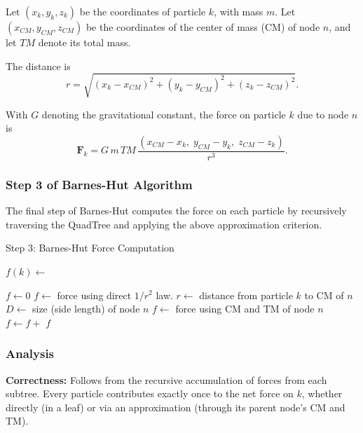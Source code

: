 \documentclass[12pt]{book}
\begin{document}
Let $(x_k,y_k,z_k)$ be the coordinates of particle $k$, with mass $m$.  
Let $(x_{CM},y_{CM},z_{CM})$ be the coordinates of the center of mass (CM) of node $n$, and let $TM$ denote its total mass.  

The distance is
\[
r = \sqrt{(x_k-x_{CM})^2 + (y_k-y_{CM})^2 + (z_k-z_{CM})^2}.
\]

With $G$ denoting the gravitational constant, the force on particle $k$ due to node $n$ is
\[
\mathbf{F}_k = G \, m \, TM \, \frac{(x_{CM}-x_k, \; y_{CM}-y_k, \; z_{CM}-z_k)}{r^3}.
\]

\subsubsection{Step 3 of Barnes-Hut Algorithm}
The final step of Barnes-Hut computes the force on each particle by recursively traversing the QuadTree and applying the above approximation criterion.

\begin{algorithm}[H]
\caption{Step 3: Barnes-Hut Force Computation}
\begin{algorithmic}[1]
    \State $f(k) \gets$ 
\EndFor

    \State $f \gets 0$
        \State {}
        \State $f \gets$ force using direct $1/r^2$ law.
    \Else
        \State $r \gets$ distance from particle $k$ to CM of $n$
        \State $D \gets$ size (side length) of node $n$
            \State {}
            \State $f \gets$ force using CM and TM of node $n$
        \Else
                \State $f \gets f +$ 
            \EndFor
        \EndIf
    \EndIf
    \State \Return $f$
\EndFunction
\end{algorithmic}
\end{algorithm}

\subsubsection{Analysis}
\textbf{Correctness:} Follows from the recursive accumulation of forces from each subtree. Every particle contributes exactly once to the net force on $k$, whether directly (in a leaf) or via an approximation (through its parent node’s CM and TM).  
\end{document}
